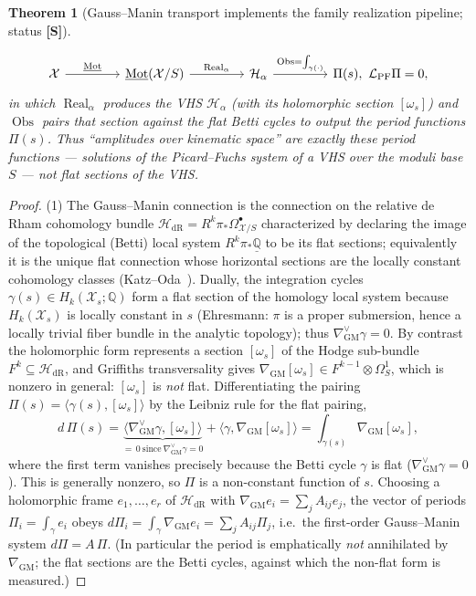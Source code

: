 \documentclass[12pt]{article}
\newtheorem{theorem}{Theorem}[section]
\theoremstyle{definition}
\theoremstyle{remark}
\newcommand{\Mot}{\operatorname{Mot}}
\newcommand{\Real}{\operatorname{Real}}
\newcommand{\Obs}{\operatorname{Obs}}
\newcommand{\QQ}{\mathbb{Q}}
\newcommand{\GM}{\nabla_{\mathrm{GM}}}
\newcommand{\status}[1]{\textnormal{\textsf{\textbf{[#1]}}}}
\begin{document}
\begin{theorem}[Gauss--Manin transport implements the family realization pipeline; status \status{S}]
\begin{enumerate}
\[\begin{tikzcd}[column sep=1.5cm]
    \mathcal X \arrow[r, "\underline{\Mot}"] &
    \underline{\Mot}(\mathcal X/S) \arrow[r, "\Real_\alpha"] &
    \mathcal H_\alpha \arrow[r, "\Obs=\int_{\gamma(\cdot)}"] &
    \Pi(s),\ \mathcal L_{\mathrm{PF}}\Pi=0,
  \end{tikzcd}
  \]
  in which $\Real_\alpha$ produces the VHS $\mathcal H_\alpha$ (with its holomorphic section $[\omega_s]$)
  and $\Obs$ pairs that section against the flat Betti cycles to output the period functions $\Pi(s)$.
  Thus ``amplitudes over kinematic space'' are exactly these period functions --- solutions of the
  Picard--Fuchs system of a VHS over the moduli base $S$ --- not flat sections of the VHS.
\end{enumerate}
\end{theorem}

\begin{proof}
(1) The Gauss--Manin connection is the connection on the relative de Rham cohomology bundle
$\mathcal H_{\mathrm{dR}} = R^k\pi_\ast\Omega^\bullet_{\mathcal X/S}$ characterized by declaring the
image of the topological (Betti) local system $R^k\pi_\ast\underline{\QQ}$ to be its flat sections;
equivalently it is the unique flat connection whose horizontal sections are the locally constant
cohomology classes (Katz--Oda~\cite{katzoda}). Dually, the integration cycles
$\gamma(s)\in H_k(\mathcal X_s;\QQ)$ form a flat section of the homology local system because
$H_k(\mathcal X_s)$ is locally constant in $s$ (Ehresmann: $\pi$ is a proper submersion, hence a locally
trivial fiber bundle in the analytic topology); thus $\GM^\vee\gamma=0$. By contrast the holomorphic form
represents a section $[\omega_s]$ of the Hodge sub-bundle $F^k\subseteq\mathcal H_{\mathrm{dR}}$, and
Griffiths transversality gives $\GM[\omega_s]\in F^{k-1}\otimes\Omega^1_S$, which is nonzero in general:
$[\omega_s]$ is \emph{not} flat. Differentiating the pairing $\Pi(s)=\langle\gamma(s),[\omega_s]\rangle$ by the Leibniz rule for the flat
pairing,
\[
  d\,\Pi(s) = \underbrace{\langle\GM^\vee\gamma,[\omega_s]\rangle}_{=\,0\ \text{since}\ \GM^\vee\gamma=0}
            + \langle\gamma,\GM[\omega_s]\rangle
            = \int_{\gamma(s)}\GM[\omega_s],
\]
where the first term vanishes precisely because the Betti cycle $\gamma$ is flat ($\GM^\vee\gamma=0$).
This is generally nonzero, so $\Pi$ is a non-constant function of $s$. Choosing a holomorphic frame
$e_1,\dots,e_r$ of $\mathcal H_{\mathrm{dR}}$ with $\GM e_i=\sum_j A_{ij}e_j$, the vector of periods
$\Pi_i=\int_\gamma e_i$ obeys $d\Pi_i=\int_\gamma\GM e_i=\sum_j A_{ij}\Pi_j$, i.e.\ the first-order
Gauss--Manin system $d\Pi=A\,\Pi$. (In particular the period is emphatically \emph{not} annihilated by
$\GM$; the flat sections are the Betti cycles, against which the non-flat form is measured.)


\end{proof}
\end{document}
